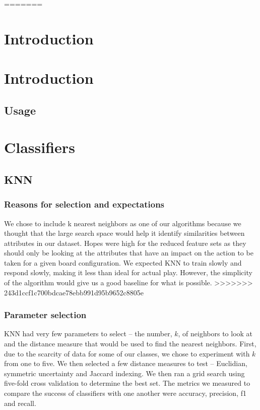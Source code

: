 \documentclass[]{article}   %
\begin{document}
=======
\section{Introduction}     %


\section{Introduction}     %
\subsection{Usage}         %

\section{Classifiers}
\subsection{KNN}
\subsubsection{Reasons for selection and expectations}
We chose to include k nearest neighbors as one of our algorithms because we thought that the large search space would help it identify similarities between attributes in our dataset. Hopes were high for the reduced feature sets as they should only be looking at the attributes that have an impact on the action to be taken for a given board configuration.  We expected KNN to train slowly and respond slowly, making it less than ideal for actual play. However, the simplicity of the algorithm would give us a good baseline for what is possible.
>>>>>>> 243d1ccf1c700bdcae78ebb991d95b9652c8805e
\subsubsection{Parameter selection}
KNN had very few parameters to select – the number, $k$, of neighbors to look at and the distance measure that would be used to find the nearest neighbors. First, due to the scarcity of data for some of our classes, we chose to experiment with $k$ from one to five. We then selected a few distance measures to test – Euclidian, symmetric uncertainty and Jaccard indexing. We then ran a grid search using five-fold cross validation to determine the best set. The metrics we measured to compare the success of classifiers with one another were accuracy, precision, f1 and recall. 
\end{document}
